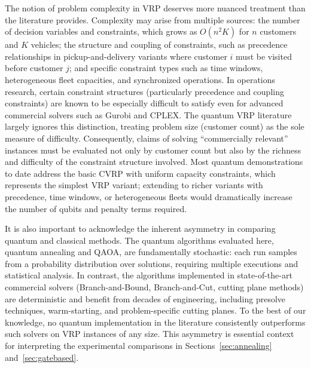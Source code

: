 \documentclass[preprint,3p,12pt,authoryear]{elsarticle}
\begin{document}
{\color{red}The notion of problem complexity in VRP deserves more nuanced treatment than the literature provides. Complexity may arise from multiple sources: the number of decision variables and constraints, which grows as $O(n^2K)$ for $n$ customers and $K$ vehicles; the structure and coupling of constraints, such as precedence relationships in pickup-and-delivery variants where customer $i$ must be visited before customer $j$; and specific constraint types such as time windows, heterogeneous fleet capacities, and synchronized operations. In operations research, certain constraint structures (particularly precedence and coupling constraints) are known to be especially difficult to satisfy even for advanced commercial solvers such as Gurobi and CPLEX. The quantum VRP literature largely ignores this distinction, treating problem size (customer count) as the sole measure of difficulty. Consequently, claims of solving ``commercially relevant'' instances must be evaluated not only by customer count but also by the richness and difficulty of the constraint structure involved. Most quantum demonstrations to date address the basic CVRP with uniform capacity constraints, which represents the simplest VRP variant; extending to richer variants with precedence, time windows, or heterogeneous fleets would dramatically increase the number of qubits and penalty terms required.}

{\color{red}It is also important to acknowledge the inherent asymmetry in comparing quantum and classical methods. The quantum algorithms evaluated here, quantum annealing and QAOA, are fundamentally stochastic: each run samples from a probability distribution over solutions, requiring multiple executions and statistical analysis. In contrast, the algorithms implemented in state-of-the-art commercial solvers (Branch-and-Bound, Branch-and-Cut, cutting plane methods) are deterministic and benefit from decades of engineering, including presolve techniques, warm-starting, and problem-specific cutting planes. To the best of our knowledge, no quantum implementation in the literature consistently outperforms such solvers on VRP instances of any size. This asymmetry is essential context for interpreting the experimental comparisons in Sections~\ref{sec:annealing} and~\ref{sec:gatebased}.}
\end{document}
